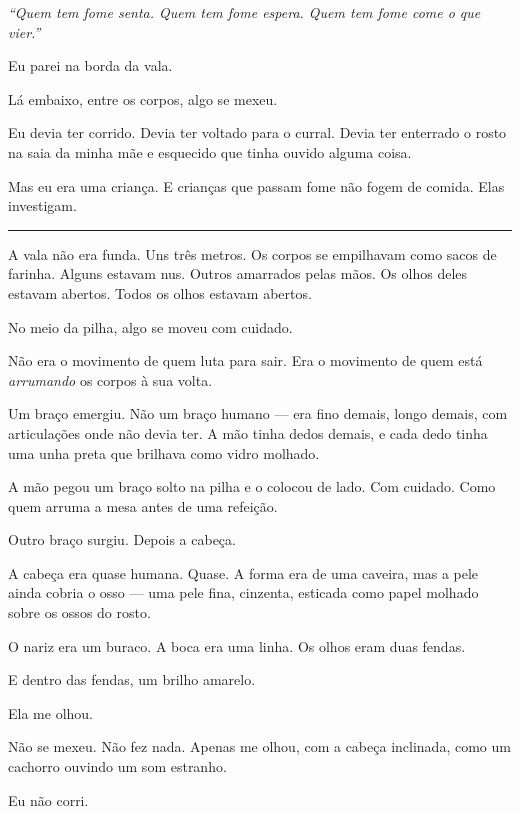 \noindent \textit{\textquotedblleft{}Quem tem fome senta. Quem tem fome espera. Quem tem fome come o que vier.\textquotedblright{}}

\noindent Eu parei na borda da vala.

\noindent Lá embaixo, entre os corpos, algo se mexeu.

\noindent Eu devia ter corrido. Devia ter voltado para o curral. Devia ter enterrado o rosto na saia da minha mãe e esquecido que tinha ouvido alguma coisa.

\noindent Mas eu era uma criança.
E crianças que passam fome não fogem de comida.
Elas investigam.

\vspace{0.5em}\noindent\rule{\textwidth}{0.5pt}\vspace{0.5em}

\noindent A vala não era funda. Uns três metros. Os corpos se empilhavam como sacos de farinha. Alguns estavam nus. Outros amarrados pelas mãos. Os olhos deles estavam abertos. Todos os olhos estavam abertos.

\noindent No meio da pilha, algo se moveu com cuidado.

\noindent Não era o movimento de quem luta para sair.
Era o movimento de quem está \textit{arrumando} os corpos à sua volta.

\noindent Um braço emergiu. Não um braço humano --- era fino demais, longo demais, com articulações onde não devia ter. A mão tinha dedos demais, e cada dedo tinha uma unha preta que brilhava como vidro molhado.

\noindent A mão pegou um braço solto na pilha e o colocou de lado. Com cuidado. Como quem arruma a mesa antes de uma refeição.

\noindent Outro braço surgiu. Depois a cabeça.

\noindent A cabeça era quase humana. Quase. A forma era de uma caveira, mas a pele ainda cobria o osso --- uma pele fina, cinzenta, esticada como papel molhado sobre os ossos do rosto.

\noindent O nariz era um buraco.
A boca era uma linha.
Os olhos eram duas fendas.

\noindent E dentro das fendas, um brilho amarelo.

\noindent Ela me olhou.

\noindent Não se mexeu. Não fez nada. Apenas me olhou, com a cabeça inclinada, como um cachorro ouvindo um som estranho.

\noindent Eu não corri.

